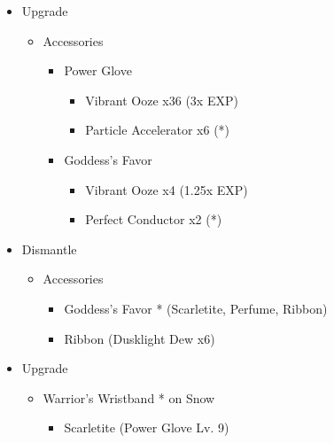 \documentclass{report}
\begin{document}
\begin{upgrade}
\begin{itemize}
    \item Upgrade
    \begin{itemize}
        \item Accessories
        \begin{itemize}
            \item Power Glove
            \begin{itemize}
                \item Vibrant Ooze x36 (3x EXP)
                \item Particle Accelerator x6 (*)
            \end{itemize}
            \item Goddess's Favor
            \begin{itemize}
                \item Vibrant Ooze x4 (1.25x EXP)
                \item Perfect Conductor x2 (*)
            \end{itemize}
        \end{itemize}
    \end{itemize}
    \item Dismantle
    \begin{itemize}
        \item Accessories
        \begin{itemize}
            \item Goddess's Favor * (Scarletite, Perfume, Ribbon)
            \item Ribbon (Dusklight Dew x6)
        \end{itemize}
    \end{itemize}
    \item Upgrade
    \begin{itemize}
        \item Warrior's Wristband * on Snow
        \begin{itemize}
            \item Scarletite (Power Glove Lv. 9)
        \end{itemize}
    \end{itemize}
\end{itemize}
\end{upgrade}
\end{document}
